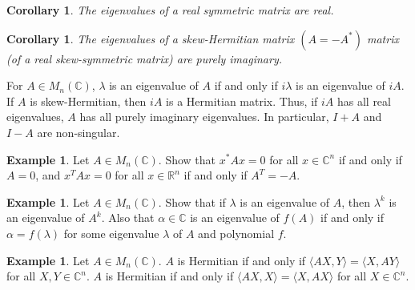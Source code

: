 \documentclass[15pt,a4paper]{book}
\newtheorem{corollary}[theorem]{Corollary}
\theoremstyle{definition}
\newtheorem{example}[theorem]{Example}
\newcommand{\R}{\mathbb{R}}
\newcommand{\C}{\mathbb{C}}
\newcommand{\ip}[1]{\langle #1 \rangle}
\begin{document}
\begin{corollary}
    The eigenvalues of a real symmetric matrix are real.
\end{corollary}
\begin{corollary}
    The eigenvalues of a skew-Hermitian matrix $(A = -A^{\ast})$ matrix (of a real skew-symmetric matrix) are purely imaginary.
\end{corollary}

For $A \in M_{n}(\C)$, $\lambda$ is an eigenvalue of $A$ if and only if $i\lambda$ is an eigenvalue of $iA$. If $A$ is skew-Hermitian, then $iA$ is a Hermitian matrix. Thus, if $iA$ has all real eigenvalues, $A$ has all purely imaginary eigenvalues. In particular, $I+A$ and $I-A$ are non-singular.

\begin{example}
    Let $A \in M_{n}(\C)$. Show that $x^{\ast}Ax = 0$ for all $x \in \C^{n}$ if and only if $A = 0$, and $x^{T}Ax = 0$ for all $x \in \R^{n}$ if and only if $A^{T} = -A$.
\end{example}

\begin{example}
    Let $A \in M_{n}(\C)$. Show that if $\lambda$ is an eigenvalue of $A$, then $\lambda^{k}$ is an eigenvalue of $A^{k}$. Also that $\alpha \in \C$ is an eigenvalue of $f(A)$ if and only if $\alpha = f(\lambda)$ for some eigenvalue $\lambda$ of $A$ and polynomial $f$.
\end{example}

\begin{example}
    Let $A \in M_{n}(\C)$. $A$ is Hermitian if and only if $\ip{AX,Y} = \ip{X,AY}$ for all $X,Y \in \C^{n}$. $A$ is Hermitian if and only if $\ip{AX,X} = \ip{X,AX}$ for all $X \in \C^{n}$.
\end{example}
\end{document}
